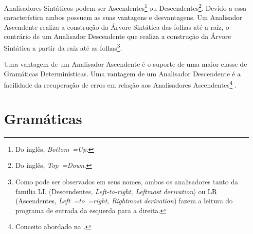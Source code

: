 Analisadores Sintáticos podem ser Ascendentes\footnote{
Do inglês, \textit{Bottom~=Up}.
}
ou Descendentes\footnote{
Do inglês, \textit{Top~=Down}.
}.
Devido a essa característica ambos possuem as suas vantagens e
desvantagens.
Um Analisador Ascendente realiza a construção da Árvore Sintática das folhas até a raíz,
o contrário de um Analisador Descendente que realiza a construção da Árvore Sintática a partir da raíz até as folhas\footnote{
Como pode ser observados em seus nomes,
ambos os analisadores tanto da familia LL (Descendentes,
\textit{Left-to-right, Leftmost derivation}) ou LR (Ascendentes, \textit{Left~=to~=right,
Rightmost derivation}) fazem a leitura do programa de entrada da esquerda para a direita.
}.

Uma vantagem de um Analisador Ascendente é o suporte de uma maior classe de Gramáticas Determinísticas.
Uma vantagem de um Analisador Descendente é a facilidade da recuperação de erros em relação aos Analisadores Ascendentes\footnote{
Conceito abordado na
.
}
\cite{sippu1982,lr1ErrorRecovery,errorRecoveryForYaccParsers,repairingSyntaxErrorsInLR,larkJosefGrosch,errorsInLRParsers}.


\section{Gramáticas}
\label{introducaoGramaticas}

